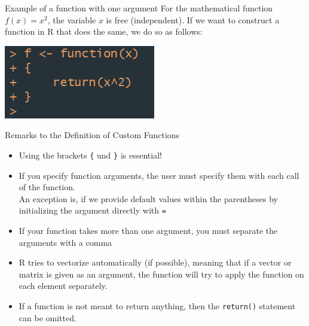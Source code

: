 \documentclass[xcolor=dvipsnames, aspectratio = 169]{beamer}
\begin{document}
\begin{frame}[fragile]{Example of a function with one argument}
  For the mathematical function $f(x) = x^2$, the variable $x$ is free (independent). If we want to construct a function in \textsf R that does the same, we do so as follows: \bigskip \\
  \begin{centering}
    \includegraphics[]{func1.png}
  \end{centering}
\end{frame}

\begin{frame}[fragile]{Remarks to the Definition of Custom Functions}
  \begin{itemize}
    \item Using the brackets \verb+{+ und \verb+}+ is essential!
    \item If you specify function arguments, the user must specify them with each call of the function. \\
An exception is, if we provide default values within the parentheses by initializing the argument directly with \verb+=+
    \item If your function takes more than one argument, you must separate the arguments with a comma 
    \item \textsf R tries to vectorize automatically (if possible), meaning that if a vector or matrix is given as an argument, the function will try to apply the function on each element separately.
    \item If a function is not meant to return anything, then the \verb+return()+ statement can be omitted.
  \end{itemize}
\end{frame}
\end{document}
